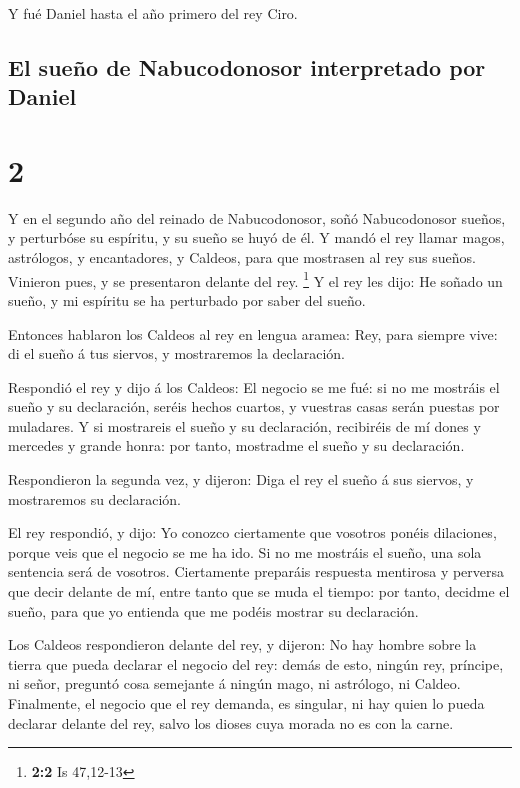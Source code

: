  Y fué Daniel hasta el año primero del rey Ciro.

\hypertarget{el-sueuxf1o-de-nabucodonosor-interpretado-por-daniel}{%
\subsection{El sueño de Nabucodonosor interpretado por
Daniel}\label{el-sueuxf1o-de-nabucodonosor-interpretado-por-daniel}}

\hypertarget{section-1}{%
\section{2}\label{section-1}}

 Y en el segundo año del reinado de Nabucodonosor, soñó
Nabucodonosor sueños, y perturbóse su espíritu, y su sueño se huyó de
él.  Y mandó el rey llamar magos, astrólogos, y
encantadores, y Caldeos, para que mostrasen al rey sus sueños. Vinieron
pues, y se presentaron delante del rey. \footnote{\textbf{2:2} Is
  47,12-13}  Y el rey les dijo: He soñado un sueño, y mi
espíritu se ha perturbado por saber del sueño.

 Entonces hablaron los Caldeos al rey en lengua aramea:
Rey, para siempre vive: di el sueño á tus siervos, y mostraremos la
declaración.

 Respondió el rey y dijo á los Caldeos: El negocio se me
fué: si no me mostráis el sueño y su declaración, seréis hechos cuartos,
y vuestras casas serán puestas por muladares.  Y si
mostrareis el sueño y su declaración, recibiréis de mí dones y mercedes
y grande honra: por tanto, mostradme el sueño y su declaración.

 Respondieron la segunda vez, y dijeron: Diga el rey el
sueño á sus siervos, y mostraremos su declaración.

 El rey respondió, y dijo: Yo conozco ciertamente que
vosotros ponéis dilaciones, porque veis que el negocio se me ha ido.
 Si no me mostráis el sueño, una sola sentencia será de
vosotros. Ciertamente preparáis respuesta mentirosa y perversa que decir
delante de mí, entre tanto que se muda el tiempo: por tanto, decidme el
sueño, para que yo entienda que me podéis mostrar su declaración.

 Los Caldeos respondieron delante del rey, y dijeron: No
hay hombre sobre la tierra que pueda declarar el negocio del rey: demás
de esto, ningún rey, príncipe, ni señor, preguntó cosa semejante á
ningún mago, ni astrólogo, ni Caldeo.  Finalmente, el
negocio que el rey demanda, es singular, ni hay quien lo pueda declarar
delante del rey, salvo los dioses cuya morada no es con la carne.

